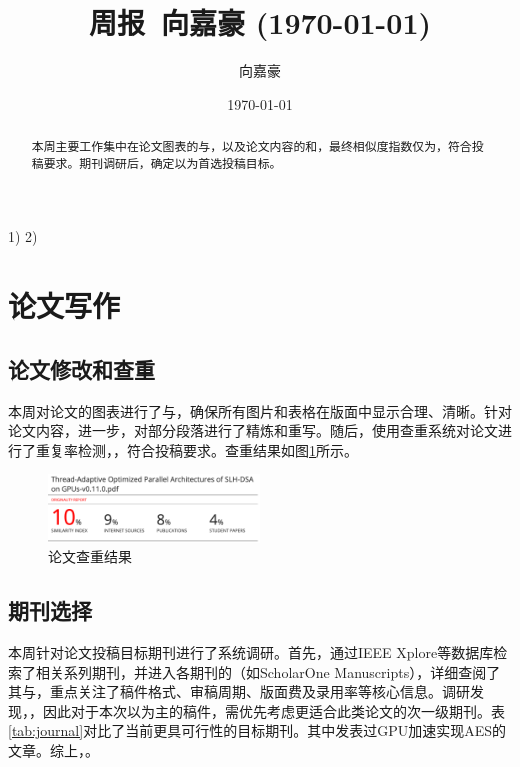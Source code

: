 \documentclass{article}
\title{周报~向嘉豪 (\today)}
\author{向嘉豪}
\date{\today}
\begin{document}
\maketitle

\begin{abstract}
  本周主要工作集中在论文图表的与，以及论文内容的和，最终相似度指数仅为，符合投稿要求。期刊调研后，确定以为首选投稿目标。
\end{abstract}

\begin{weekplan}
1) 
2) 
\end{weekplan}

\section{论文写作}

\subsection{论文修改和查重}

本周对论文的图表进行了与，确保所有图片和表格在版面中显示合理、清晰。针对论文内容，进一步，对部分段落进行了精炼和重写。随后，使用查重系统对论文进行了重复率检测，，符合投稿要求。查重结果如图\ref{fig:repetition}所示。

\begin{figure}[ht]
\centering
\includegraphics[width=0.5\textwidth]{./fig/reptition.png}
\caption{论文查重结果}
\label{fig:repetition}
\end{figure}

\subsection{期刊选择}

本周针对论文投稿目标期刊进行了系统调研。首先，通过IEEE Xplore等数据库检索了相关系列期刊，并进入各期刊的（如ScholarOne Manuscripts），详细查阅了其与，重点关注了稿件格式、审稿周期、版面费及录用率等核心信息。调研发现，，因此对于本次以为主的稿件，需优先考虑更适合此类论文的次一级期刊。表\ref{tab:journal}对比了当前更具可行性的目标期刊。其中发表过GPU加速实现AES的文章\cite{Lee2022Jeong}。综上，。
\end{document}
